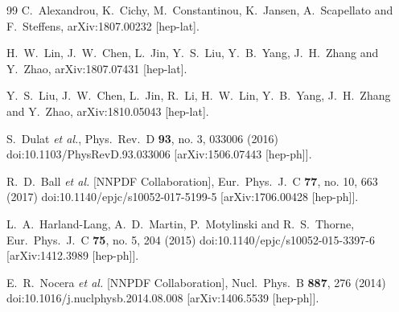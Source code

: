 \begin{thebibliography}{99}
  C.~Alexandrou, K.~Cichy, M.~Constantinou, K.~Jansen, A.~Scapellato and F.~Steffens,
  arXiv:1807.00232 [hep-lat].


  H.~W.~Lin, J.~W.~Chen, L.~Jin, Y.~S.~Liu, Y.~B.~Yang, J.~H.~Zhang and Y.~Zhao,
  arXiv:1807.07431 [hep-lat].

  Y.~S.~Liu, J.~W.~Chen, L.~Jin, R.~Li, H.~W.~Lin, Y.~B.~Yang, J.~H.~Zhang and Y.~Zhao,
  arXiv:1810.05043 [hep-lat].


  S.~Dulat {\it et al.},
  Phys.\ Rev.\ D {\bf 93}, no. 3, 033006 (2016)
  doi:10.1103/PhysRevD.93.033006
  [arXiv:1506.07443 [hep-ph]].


  R.~D.~Ball {\it et al.} [NNPDF Collaboration],
  Eur.\ Phys.\ J.\ C {\bf 77}, no. 10, 663 (2017)
  doi:10.1140/epjc/s10052-017-5199-5
  [arXiv:1706.00428 [hep-ph]].


  L.~A.~Harland-Lang, A.~D.~Martin, P.~Motylinski and R.~S.~Thorne,
  Eur.\ Phys.\ J.\ C {\bf 75}, no. 5, 204 (2015)
  doi:10.1140/epjc/s10052-015-3397-6
  [arXiv:1412.3989 [hep-ph]].


  E.~R.~Nocera {\it et al.} [NNPDF Collaboration],
  Nucl.\ Phys.\ B {\bf 887}, 276 (2014)
  doi:10.1016/j.nuclphysb.2014.08.008
  [arXiv:1406.5539 [hep-ph]].



\end{thebibliography}
